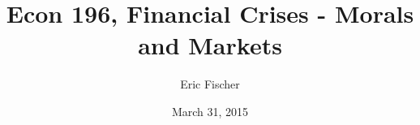 \documentclass{beamer}
\begin{document}
\title[Introduction and Overview]{Econ 196, Financial Crises - Morals and
Markets}
\author[Eric Fischer]{Eric Fischer}
\institute[UCSC]{}
\date{March 31, 2015}
\maketitle
\end{document}
